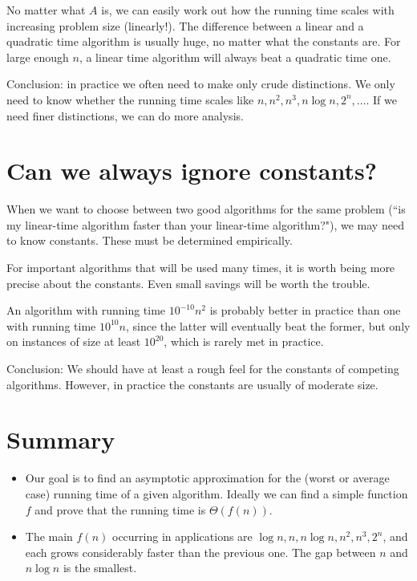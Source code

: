 No matter what $A$ is, we can easily work out how the running time
scales with increasing problem size (linearly!). The difference between a linear and a quadratic time algorithm is
usually huge, no matter what the constants are. For large enough $n$, a
linear time algorithm will always beat a quadratic time one. 

Conclusion: in practice we often need to make only crude distinctions. 
We only need to know whether the running time scales like $n, n^2, n^3, n \log n, 2^n, \dots$. 
If we need finer distinctions, we can do more analysis.

\section{Can we always ignore constants?}
When we want to choose between two good algorithms for the same
problem (``is my linear-time algorithm faster than your linear-time
algorithm?"), we may need to know constants. These must be determined
empirically. 

For important algorithms that will be used many times, it is worth
being more precise about the constants. 
Even small savings will be worth the trouble. 

An algorithm with running time $10^{-10} n^2$ is probably better
in practice than one with running time $10^{10} n$, since the latter
will eventually beat the former, but only on instances of size at least $10^{20}$, 
which is rarely met in practice. 

Conclusion: We should have at least a rough feel for the constants
of competing algorithms. However, in practice the constants are usually
of moderate size. 

\section{Summary}
\begin{itemize}
\item Our goal is to find an asymptotic approximation for the (worst or average 
case) running time of a given algorithm. Ideally we can find a simple function 
$f$ and prove that the running time is $\Theta(f(n))$.
\item The main $f(n)$ occurring in applications are $\log n, n, n \log n, n^2, n^3, 2^n$, and 
each grows considerably faster than the previous one. The gap between $n$ and 
$n \log n$ is the smallest.
\end{itemize}
